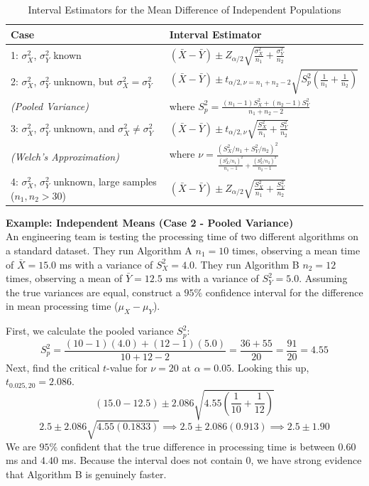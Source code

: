 \documentclass{article}
\begin{document}
\begin{table}[htbp]
\centering
\bgroup
\def\arraystretch{2.0}
\begin{tabular}{ll}
\hline
\textbf{Case} & \textbf{Interval Estimator} \\ \hline
1: $\sigma^2_X$, $\sigma^2_Y$ known  & $(\bar{X} - \bar{Y}) \pm Z_{\alpha/2} \sqrt{\frac{\sigma^2_X}{n_1} + \frac{\sigma^2_Y}{n_2}}$ \\
2: $\sigma^2_X$, $\sigma^2_Y$ unknown, but $\sigma^2_X = \sigma^2_Y$ & $(\bar{X} - \bar{Y}) \pm t_{\alpha/2, \nu = n_1 + n_2 - 2} \sqrt{S^2_p \left(\frac{1}{n_1} + \frac{1}{n_2} \right)}$ \\
\emph{(Pooled Variance)} & where $S^2_p = \frac{(n_1 - 1)S^2_X + (n_2 - 1)S^2_Y}{n_1 + n_2 - 2}$ \\
3: $\sigma^2_X$, $\sigma^2_Y$ unknown, and $\sigma^2_X \neq \sigma^2_Y$ & $(\bar{X} - \bar{Y}) \pm t_{\alpha/2, \nu} \sqrt{\frac{S^2_X}{n_1} + \frac{S^2_Y}{n_2}}$ \\
\emph{(Welch's Approximation)} & where $\nu = \frac{(S^2_X / n_1 + S^2_Y / n_2)^2}{\frac{(S^2_X/n_1)^2}{n_1 - 1} + \frac{(S^2_Y/n_2)^2}{n_2 - 1}}$ \\ 
4: $\sigma^2_X$, $\sigma^2_Y$ unknown, large samples ($n_1, n_2 > 30$) & $(\bar{X} - \bar{Y}) \pm Z_{\alpha/2} \sqrt{\frac{S^2_X}{n_1} + \frac{S^2_Y}{n_2}}$ \\ \hline \hline
\end{tabular}
\egroup
\caption{\label{tab:indintervals} Interval Estimators for the Mean Difference of Independent Populations}
\end{table}

\textbf{Example: Independent Means (Case 2 - Pooled Variance)} \\
An engineering team is testing the processing time of two different algorithms on a standard dataset. They run Algorithm A $n_1=10$ times, observing a mean time of $\bar{X}=15.0$ ms with a variance of $S^2_X=4.0$. They run Algorithm B $n_2=12$ times, observing a mean of $\bar{Y}=12.5$ ms with a variance of $S^2_Y=5.0$. Assuming the true variances are equal, construct a $95\%$ confidence interval for the difference in mean processing time ($\mu_X - \mu_Y$).

First, we calculate the pooled variance $S^2_p$:
$$ S^2_p = \frac{(10 - 1)(4.0) + (12 - 1)(5.0)}{10 + 12 - 2} = \frac{36 + 55}{20} = \frac{91}{20} = 4.55 $$
Next, find the critical $t$-value for $\nu = 20$ at $\alpha=0.05$. Looking this up, $t_{0.025, 20} = 2.086$.
$$ (15.0 - 12.5) \pm 2.086 \sqrt{4.55 \left(\frac{1}{10} + \frac{1}{12}\right)} $$
$$ 2.5 \pm 2.086 \sqrt{4.55(0.1833)} \implies 2.5 \pm 2.086(0.913) \implies 2.5 \pm 1.90 $$
We are $95\%$ confident that the true difference in processing time is between $0.60$ ms and $4.40$ ms. Because the interval does not contain $0$, we have strong evidence that Algorithm B is genuinely faster.
\end{document}

